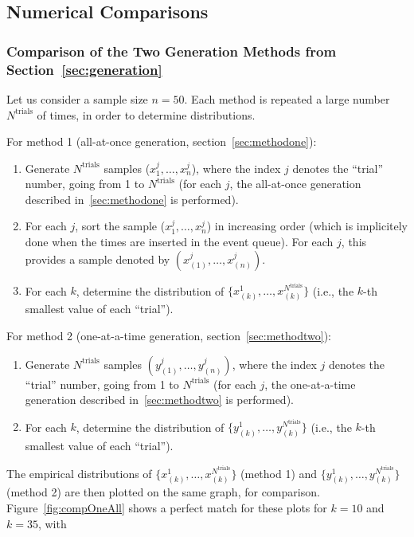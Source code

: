 \documentclass[12pt]{article} %
\begin{document}
\subsection{Numerical Comparisons}
%
%
\subsubsection{Comparison of the Two Generation Methods from Section~\ref{sec:generation}}
Let us consider a sample size $n=50$. Each method is repeated a large
number $N^\text{trials}$ of times, in order to determine
distributions.\par
For method 1 (all-at-once generation, section~\ref{sec:methodone}):
\begin{enumerate}
\item Generate $N^\text{trials}$ samples ($x^j_1,\ldots,x^j_n$), where
  the index $j$ denotes the ``trial'' number, going from 1 to
  $N^\text{trials}$ (for each $j$, the all-at-once generation
  described in~\ref{sec:methodone} is performed).
\item For each $j$, sort the sample ($x^j_1,\ldots,x^j_n$) in
  increasing order (which is implicitely done when the times are
  inserted in the event queue). For each $j$, this provides a sample
  denoted by $(x^j_{(1)},\ldots,x^j_{(n)})$.
\item For each $k$, determine the distribution of
  $\{x^1_{(k)},\ldots,x^{N^\text{trials}}_{(k)}\}$ (i.e., the $k$-th
  smallest value of each ``trial'').
\end{enumerate}
For method 2 (one-at-a-time generation, section~\ref{sec:methodtwo}):
\begin{enumerate}
\item Generate $N^\text{trials}$ samples
  $(y^j_{(1)},\ldots,y^j_{(n)})$, where the index $j$ denotes the
  ``trial'' number, going from 1 to $N^\text{trials}$ (for each $j$,
  the one-at-a-time generation described in~\ref{sec:methodtwo} is
  performed).
\item For each $k$, determine the distribution of
  $\{y^1_{(k)},\ldots,y^{N^\text{trials}}_{(k)}\}$ (i.e., the $k$-th
  smallest value of each ``trial'').
\end{enumerate}
The empirical distributions of
$\{x^1_{(k)},\ldots,x^{N^\text{trials}}_{(k)}\}$ (method 1) and
$\{y^1_{(k)},\ldots,y^{N^\text{trials}}_{(k)}\}$ (method 2) are then
plotted on the same graph, for comparison. Figure~\ref{fig:compOneAll}
shows a perfect match for these plots for $k=10$ and $k=35$, with
\end{document}
